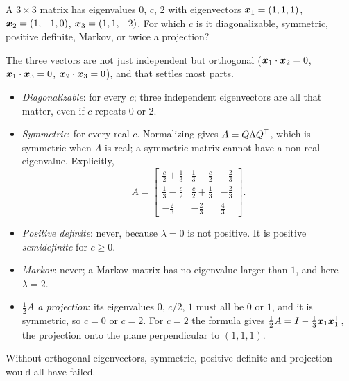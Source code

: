 \begin{example}\label{ex:u37-givenx}
A $3\times3$ matrix has eigenvalues $0$, $c$, $2$ with eigenvectors
$\boldsymbol{x}_1=(1,1,1)$, $\boldsymbol{x}_2=(1,-1,0)$, $\boldsymbol{x}_3=(1,1,-2)$. For which $c$ is it diagonalizable, symmetric, positive definite, Markov, or twice a projection?

The three vectors are not just independent but orthogonal ($\boldsymbol{x}_1\cdot\boldsymbol{x}_2=0$, $\boldsymbol{x}_1\cdot\boldsymbol{x}_3=0$, $\boldsymbol{x}_2\cdot\boldsymbol{x}_3=0$), and that settles most parts.
\begin{itemize}
\item \emph{Diagonalizable}: for every $c$; three independent eigenvectors are all that matter, even if $c$ repeats $0$ or $2$.
\item \emph{Symmetric}: for every real $c$. Normalizing gives $A=Q\Lambda Q^{\mathsf{T}}$, which is symmetric when $\Lambda$ is real; a symmetric matrix cannot have a non-real eigenvalue. Explicitly,
\[
A=\begin{bmatrix}\tfrac{c}{2}+\tfrac13&\tfrac13-\tfrac{c}{2}&-\tfrac23\\[2pt]\tfrac13-\tfrac{c}{2}&\tfrac{c}{2}+\tfrac13&-\tfrac23\\[2pt]-\tfrac23&-\tfrac23&\tfrac43\end{bmatrix}.
\]
\item \emph{Positive definite}: never, because $\lambda=0$ is not positive. It is positive \emph{semidefinite} for $c\ge0$.
\item \emph{Markov}: never; a Markov matrix has no eigenvalue larger than $1$, and here $\lambda=2$.
\item \emph{$\tfrac12A$ a projection}: its eigenvalues $0$, $c/2$, $1$ must all be $0$ or $1$, and it is symmetric, so $c=0$ or $c=2$. For $c=2$ the formula gives $\tfrac12A=I-\tfrac13\boldsymbol{x}_1\boldsymbol{x}_1^{\mathsf{T}}$, the projection onto the plane perpendicular to $(1,1,1)$.
\end{itemize}
Without orthogonal eigenvectors, symmetric, positive definite and projection would all have failed.
\end{example}

